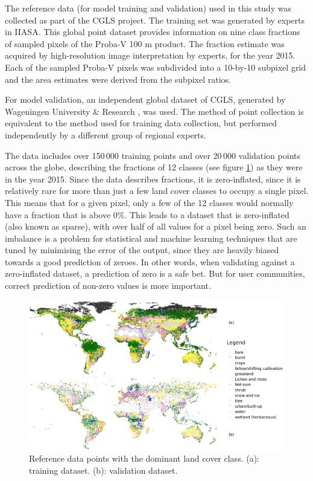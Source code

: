 \documentclass[a4paper,10pt]{article}
\begin{document}
The reference data (for model training and validation) used in this study was collected as part of the \ac{CGLS} project.
The training set was generated by experts in \ac{IIASA}.
This global point dataset provides information on nine class fractions of sampled pixels of the Proba-V 100 m product.
The fraction estimate was acquired by high-resolution image interpretation by experts, for the year 2015.
Each of the sampled Proba-V pixels was subdivided into a 10-by-10 subpixel grid and the area estimates were derived from the subpixel ratios.

For model validation, an independent global dataset of \ac{CGLS}, generated by Wageningen University \& Research \citep{tsendbazar_developing_2018}, was used.
The method of point collection is equivalent to the method used for training data collection, but performed independently by a different group of regional experts.

The data includes over 150\,000 training points and over 20\,000 validation points across the globe, describing the fractions of 12 classes (see figure \ref{fig-reference-data}) as they were in the year 2015.
Since the data describes fractions, it is zero-inflated, since it is relatively rare for more than just a few land cover classes to occupy a single pixel.
This means that for a given pixel, only a few of the 12 classes would normally have a fraction that is above 0\%.
This leads to a dataset that is zero-inflated (also known as sparse), with over half of all values for a pixel being zero.
Such an imbalance is a problem for statistical and machine learning techniques that are tuned by minimising the error of the output, since they are heavily biased towards a good prediction of zeroes.
In other words, when validating against a zero-inflated dataset, a prediction of zero is a safe bet.
But for user communities, correct prediction of non-zero values is more important.

\begin{figure}
 \includegraphics[width=\textwidth]{article-figures/maps/2019-08-06-training-and-validation}
 \caption{Reference data points with the dominant land cover class. (a): training dataset. (b): validation dataset.}
 \label{fig-reference-data}
\end{figure}
\end{document}
